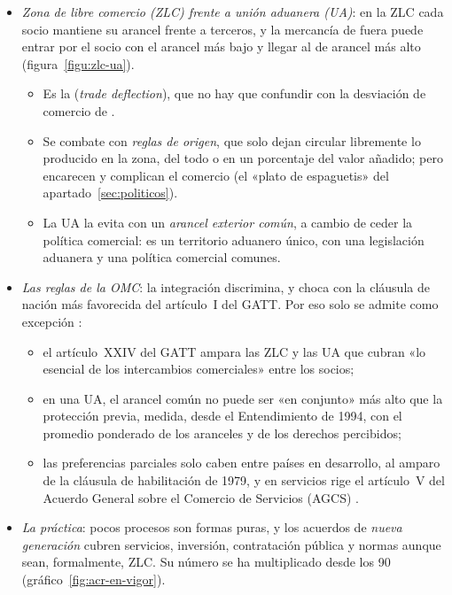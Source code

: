 \documentclass[11pt]{article}
\begin{document}
\begin{itemize}
\item \emph{Zona de libre comercio (ZLC) frente a unión aduanera (UA)}: en la ZLC cada socio mantiene su arancel frente a terceros, y la mercancía de fuera puede entrar por el socio con el arancel más bajo y llegar al de arancel más alto (figura~\ref{figu:zlc-ua}).
  \begin{itemize}
  \item Es la  (\emph{trade deflection}), que no hay que confundir con la desviación de comercio de .
  \item Se combate con \emph{reglas de origen}, que solo dejan circular libremente lo producido en la zona, del todo o en un porcentaje del valor añadido; pero encarecen y complican el comercio (el «plato de espaguetis» del apartado~\ref{sec:politicos}).
  \item La UA la evita con un \emph{arancel exterior común}, a cambio de ceder la política comercial: es un territorio aduanero único, con una legislación aduanera y una política comercial comunes.
  \end{itemize}
\end{itemize}

\begin{infografia}[H]
\centering
\caption{Zona de libre comercio y desviación del tráfico (izquierda) frente a unión aduanera con arancel exterior común (derecha)}\label{figu:zlc-ua}
\end{infografia}

\begin{itemize}
\item \emph{Las reglas de la OMC}: la integración discrimina, y choca con la cláusula de nación más favorecida del artículo~I del GATT. Por eso solo se admite como excepción :
  \begin{itemize}
  \item el artículo~XXIV del GATT ampara las ZLC y las UA que cubran «lo esencial de los intercambios comerciales» entre los socios\nocite{GATT1947};
  \item en una UA, el arancel común no puede ser «en conjunto» más alto que la protección previa, medida, desde el Entendimiento de 1994, con el promedio ponderado de los aranceles y de los derechos percibidos\nocite{OMC1994EntendimientoXXIV};
  \item las preferencias parciales solo caben entre países en desarrollo, al amparo de la cláusula de habilitación de 1979\nocite{GATT1979Habilitacion}, y en servicios rige el artículo~V del Acuerdo General sobre el Comercio de Servicios (AGCS) .
  \end{itemize}
\item \emph{La práctica}: pocos procesos son formas puras, y los acuerdos de \emph{nueva generación} cubren servicios, inversión, contratación pública y normas aunque sean, formalmente, ZLC. Su número se ha multiplicado desde los 90 (gráfico~\ref{fig:acr-en-vigor}).
\end{itemize}
\end{document}
